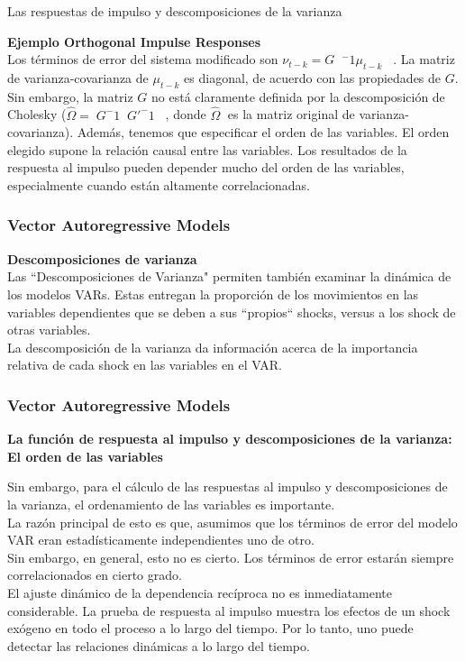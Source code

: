 \documentclass[spanish,xcolor=table]{beamer}
\begin{document}
\begin{section}{Las respuestas de impulso y descomposiciones de la varianza}
\begin{frame}
\textbf{Ejemplo Orthogonal Impulse Responses}\\
Los t\'erminos de error del sistema modificado son $\nu_{t-k}=G􏰄􏰁^-1\mu_{t-k}$􏰂􏰄􏰟. La matriz de varianza-covarianza de $\mu_{t-k}$ es diagonal, de acuerdo con las propiedades de $G$. Sin embargo, la matriz $G$ no est\'a claramente definida por la descomposici\'on de Cholesky ($\hat{\Omega} =􏰃 G^-1􏰄􏰁G'^-1$􏰥􏰄􏰁, donde $\hat{\Omega}$􏰤 es la matriz original de varianza-covarianza). Adem\'as, tenemos que especificar el orden de las variables. El orden elegido supone la relaci\'on causal entre las variables. Los resultados de la respuesta al impulso pueden depender mucho del orden de las variables, especialmente cuando est\'an altamente correlacionadas.

\end{frame}
\begin{frame}
\frametitle{Vector Autoregressive Models}

\textbf{Descomposiciones de varianza}\\

Las ``Descomposiciones de Varianza" permiten tambi\'en examinar la din\'amica de los modelos VARs. Estas entregan la proporci\'on de los movimientos en las variables dependientes que se deben a sus ``propios“ shocks, versus a los shock de otras variables.\\

La descomposici\'on de la varianza da informaci\'on acerca de la importancia relativa de cada shock en las variables en el VAR.


\end{frame}
\begin{frame}
\frametitle{Vector Autoregressive Models}

\textbf{La funci\'on de respuesta al impulso y descomposiciones de la varianza: El orden de las variables}

Sin embargo, para el c\'alculo de las respuestas al impulso y descomposiciones de la varianza, el ordenamiento de las variables es importante.\\
La raz\'on principal de esto es que, asumimos que los t\'erminos de error del modelo VAR eran estad\'{i}sticamente independientes uno de otro.\\
Sin embargo, en general, esto no es cierto. Los t\'erminos de error estar\'an siempre correlacionados en cierto grado.\\
El ajuste din\'amico de la dependencia rec\'{i}proca no es inmediatamente considerable. La prueba de respuesta al impulso muestra los efectos de un shock ex\'ogeno en todo el proceso a lo largo del tiempo. Por lo tanto, uno puede detectar las relaciones din\'amicas a lo largo del tiempo.\\


\end{frame}
\end{section}
\end{document}
